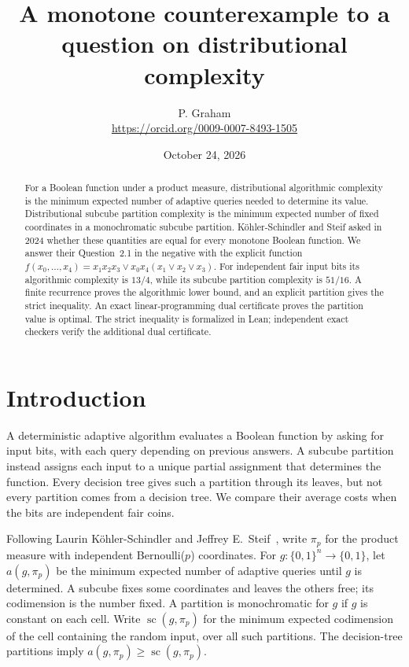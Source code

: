 \documentclass[11pt]{article}
\title{A monotone counterexample to a question on distributional complexity}
\author{P. Graham\\ \small\url{https://orcid.org/0009-0007-8493-1505}}
\date{October 24, 2026}
\newcommand{\scplx}{\operatorname{sc}}
\begin{document}
\maketitle
\begingroup
\renewcommand{\thefootnote}{}
\endgroup
\begin{abstract}
For a Boolean function under a product measure, distributional algorithmic
complexity is the minimum expected number of adaptive queries needed to
determine its value. Distributional subcube partition complexity is the
minimum expected number of fixed coordinates in a monochromatic subcube
partition. K\"ohler-Schindler and Steif asked in 2024 whether these quantities
are equal for every monotone Boolean function. We answer their Question~2.1
in the negative with the explicit function
$f(x_0,\ldots,x_4)=x_1x_2x_3\lor x_0x_4(x_1\lor x_2\lor x_3)$.
For independent fair input bits its algorithmic complexity is $13/4$,
while its subcube partition complexity is $51/16$.
A finite recurrence proves the algorithmic lower bound, and an explicit
partition gives the strict inequality. An exact linear-programming dual
certificate proves the partition value is optimal. The strict inequality
is formalized in Lean; independent exact checkers verify the additional
dual certificate.
\end{abstract}

\section{Introduction}
A deterministic adaptive algorithm evaluates a Boolean function by asking for input bits,
with each query depending on previous answers. A subcube partition instead
assigns each input to a unique partial assignment that determines the
function. Every decision tree gives such a partition through its leaves,
but not every partition comes from a decision tree. We compare their
average costs when the bits are independent fair coins.

Following Laurin K\"ohler-Schindler and Jeffrey E.\ Steif~\cite{KS}, write
$\pi_p$ for the product measure with independent Bernoulli($p$) coordinates.
For $g:\{0,1\}^n\to\{0,1\}$, let $a(g,\pi_p)$ be the minimum expected
number of adaptive queries until $g$ is determined. A subcube fixes some
coordinates and leaves the others free; its codimension is the number
fixed. A partition is monochromatic for $g$ if $g$ is constant on each
cell. Write $\scplx(g,\pi_p)$ for the minimum expected codimension of the
cell containing the random input, over all such partitions.
The decision-tree partitions imply $a(g,\pi_p)\geq\scplx(g,\pi_p)$.
\end{document}
